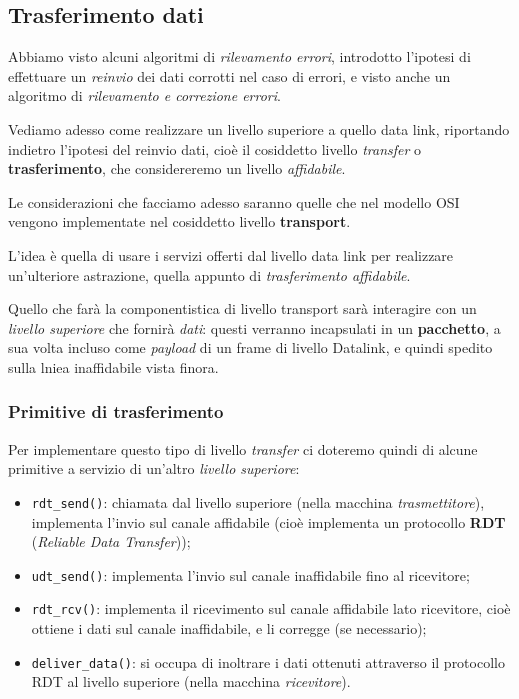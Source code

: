 \documentclass[a4paper,11pt]{article}
\begin{document}
\subsection{Trasferimento dati}
Abbiamo visto alcuni algoritmi di \textit{rilevamento errori}, introdotto l'ipotesi di effettuare un \textit{reinvio} dei dati corrotti nel caso di errori, e visto anche un algoritmo di \textit{rilevamento e correzione errori}.

Vediamo adesso come realizzare un livello superiore a quello data link, riportando indietro l'ipotesi del reinvio dati, cioè il cosiddetto livello \textit{transfer} o \textbf{trasferimento}, che considereremo un livello \textit{affidabile}.

Le considerazioni che facciamo adesso saranno quelle che nel modello OSI vengono implementate nel cosiddetto livello \textbf{transport}.

L'idea è quella di usare i servizi offerti dal livello data link per realizzare un'ulteriore astrazione, quella appunto di \textit{trasferimento affidabile}.

Quello che farà la componentistica di livello transport sarà interagire con un \textit{livello superiore} che fornirà \textit{dati}: questi verranno incapsulati in un \textbf{pacchetto}, a sua volta incluso come \textit{payload} di un frame di livello Datalink, e quindi spedito sulla lniea inaffidabile vista finora.

\subsubsection{Primitive di trasferimento}
Per implementare questo tipo di livello \textit{transfer} ci doteremo quindi di alcune primitive a servizio di un'altro \textit{livello superiore}:
\begin{itemize}
	\item \lstinline|rdt_send()|: chiamata dal livello superiore (nella macchina \textit{trasmettitore}), implementa l'invio sul canale affidabile (cioè implementa un protocollo \textbf{RDT} (\textit{Reliable Data Transfer}));
	\item \lstinline|udt_send()|: implementa l'invio sul canale inaffidabile fino al ricevitore;
	\item \lstinline|rdt_rcv()|: implementa il ricevimento sul canale affidabile lato ricevitore, cioè ottiene i dati sul canale inaffidabile, e li corregge (se necessario); 
	\item \lstinline|deliver_data()|: si occupa di inoltrare i dati ottenuti attraverso il protocollo RDT al livello superiore (nella macchina \textit{ricevitore}).
\end{itemize}
\end{document}
